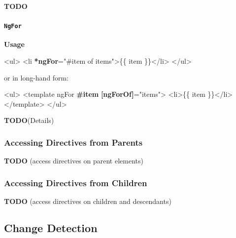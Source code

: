 \documentclass[12pt,]{article}
\newenvironment{Shaded}{}{}
\newcommand{\KeywordTok}[1]{\textcolor[rgb]{0.00,0.00,1.00}{{#1}}}
\newcommand{\StringTok}[1]{\textcolor[rgb]{0.00,0.50,0.50}{{#1}}}
\newcommand{\OtherTok}[1]{\textcolor[rgb]{1.00,0.25,0.00}{{#1}}}
\newcommand{\ErrorTok}[1]{\textcolor[rgb]{1.00,0.00,0.00}{\textbf{{#1}}}}
\newcommand{\NormalTok}[1]{{#1}}
\let\oldparagraph\paragraph
\renewcommand{\paragraph}[1]{\oldparagraph{#1}\mbox{}}
\begin{document}
\textbf{TODO}

\paragraph{\texorpdfstring{\texttt{NgFor}}{NgFor}}\label{ngfor}

\textbf{Usage}

\begin{Shaded}
\begin{Highlighting}[numbers=left,,]
\KeywordTok{<ul>}
   \KeywordTok{<li} \ErrorTok{*ngFor}\OtherTok{=}\StringTok{"#item of items"}\KeywordTok{>}\NormalTok{\{\{ item \}\}}\KeywordTok{</li>}
\KeywordTok{</ul>}
\end{Highlighting}
\end{Shaded}

or in long-hand form:

\begin{Shaded}
\begin{Highlighting}[numbers=left,,]
\KeywordTok{<ul>}
  \KeywordTok{<template}\OtherTok{ ngFor} \ErrorTok{#item} \ErrorTok{[ngForOf]}\OtherTok{=}\StringTok{"items"}\KeywordTok{>}
    \KeywordTok{<li>}\NormalTok{\{\{ item \}\}}\KeywordTok{</li>}
  \KeywordTok{</template>}
\KeywordTok{</ul>}
\end{Highlighting}
\end{Shaded}

\textbf{TODO}(Details)

\subsubsection{Accessing Directives from
Parents}\label{accessing-directives-from-parents}

\textbf{TODO} (access directives on parent elements)

\subsubsection{Accessing Directives from
Children}\label{accessing-directives-from-children}

\textbf{TODO} (access directives on children and descendants)

\subsection{Change Detection}\label{change-detection}
\end{document}
